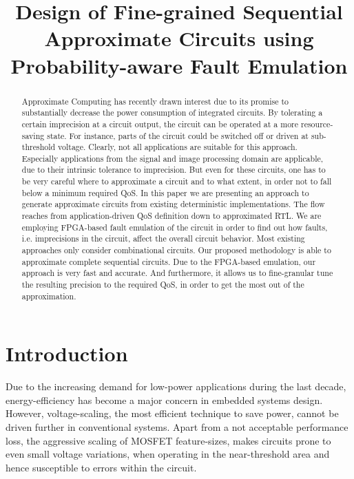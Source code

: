 \documentclass[conference]{IEEEtran}
\begin{document}
\title{Design of Fine-grained Sequential Approximate Circuits using Probability-aware Fault Emulation}


\author{
\IEEEauthorblockA{}
\and
{}
\IEEEauthorblockA{}
}


\maketitle


\begin{abstract}
Approximate Computing has recently drawn interest due to its promise to substantially decrease the power consumption of integrated circuits. By tolerating a certain imprecision at a circuit output, the circuit can be operated at a more resource-saving state. For instance, parts of the circuit could be switched off or driven at sub-threshold voltage. Clearly, not all applications are suitable for this approach. Especially applications from the signal and image processing domain are applicable, due to their intrinsic tolerance to imprecision. But even for these circuits, one has to be very careful where to approximate a circuit and to what extent, in order not to fall below a minimum required QoS.
In this paper we are presenting an approach to generate approximate circuits from existing deterministic implementations. The flow reaches from application-driven QoS definition down to approximated RTL. We are employing FPGA-based fault emulation of the circuit in order to find out how faults, i.e. imprecisions in the circuit, affect the overall circuit behavior.
Most existing approaches only consider combinational circuits. Our proposed methodology is able to approximate complete sequential circuits. Due to the FPGA-based emulation, our approach is very fast and accurate. And furthermore, it allows us to fine-granular tune the resulting precision to the required QoS, in order to get the most out of the approximation.
\end{abstract}

\IEEEpeerreviewmaketitle



\section{Introduction}
Due to the increasing demand for low-power applications during the last decade, energy-efficiency has become a major concern in embedded systems design. However, voltage-scaling, the most efficient technique to save power, cannot be driven further in conventional systems. Apart from a not acceptable performance loss, the aggressive scaling of \mbox{MOSFET} feature-sizes, makes circuits prone to even small voltage variations, when operating in the near-threshold area and hence susceptible to errors within the circuit.
\end{document}
